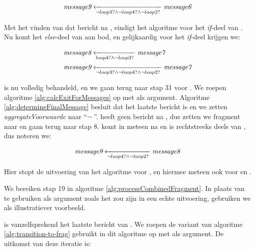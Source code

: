 \begin{align*}
	\transitionentry[\fragmessage{message6}]{\lnot \fragcond{loop3} \land \lnot \fragcond{loop4} \land \lnot \fragcond{loop2}}{\fragmessage{message9}}
\end{align*}

Met het vinden van dat bericht na , eindigt het algoritme voor het \textit{if}-deel van . Nu komt het \textit{else}-deel van  aan bod, en gelijkaardig voor het \textit{if}-deel krijgen we:

\begin{align*}
		&\transitionentry[\fragmessage{message7}]{\fragcond{loop4} \land \lnot \fragcond{loop3}}{\fragmessage{message8}} \\
		&\transitionentry[\fragmessage{message7}]{\lnot \fragcond{loop3} \land \lnot \fragcond{loop4} \land \lnot \fragcond{loop2}}{\fragmessage{message9}}
\end{align*}

 is nu volledig behandeld, en we gaan terug naar stap 31 voor . We roepen algoritme \ref{alg:calcExitForMessages} op met  als argument. Algoritme \ref{alg:determineFinalMessage} besluit dat  het laatste bericht is en we zetten \textit{aggregateVoorwaarde} naar ``$\lnot$ ''.  heeft geen bericht na , dus zetten we fragment naar  en gaan terug naar stap 8.  komt in  meteen na  en is rechtstreeks deels van , dus noteren we:

\begin{align*}
	\transitionentry[\fragmessage{message8}]{\lnot \fragcond{loop4} \land \lnot \fragcond{loop2}}{\fragmessage{message9}}
\end{align*}

Hier stopt de uitvoering van het algoritme voor , en hiermee meteen ook voor  en .

\parbreak

We bereiken stap 19 in algoritme \ref{alg:processCombinedFragment}. In plaats van  te gebruiken als argument zoals het zou zijn in een echte uitvoering, gebruiken we  als illustratiever voorbeeld.

 is vanzelfsprekend het laatste bericht van . We roepen de variant van algoritme \ref{alg:transition-to-frag} gebruikt in dit algoritme op met  als argument. De uitkomst van deze iteratie is:

